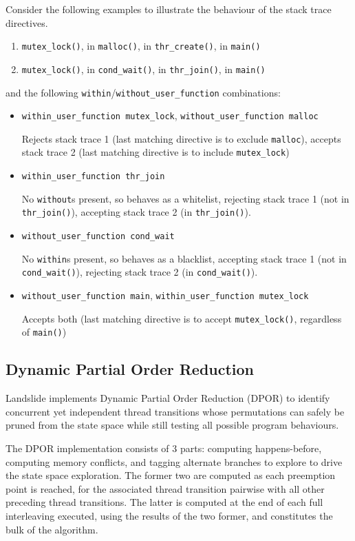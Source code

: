 Consider the following examples to illustrate the behaviour of the stack trace directives.
\begin{enumerate}
	\item
		{\tt mutex\_lock()}, in
		{\tt malloc()}, in
		{\tt thr\_create()}, in
		{\tt main()}
	\item
		{\tt mutex\_lock()}, in
		{\tt cond\_wait()}, in
		{\tt thr\_join()}, in
		{\tt main()}
\end{enumerate}
and the following {\tt within}/{\tt without\_user\_function} combinations:
\begin{itemize}
	\item
		{\tt within\_user\_function mutex\_lock},
		{\tt without\_user\_function malloc}

		Rejects stack trace 1 (last matching directive is to exclude {\tt malloc}),
		accepts stack trace 2 (last matching directive is to include {\tt mutex\_lock})
	\item
		{\tt within\_user\_function thr\_join}

		No {\tt without}s present, so behaves as a whitelist,
		rejecting stack trace 1 (not in {\tt thr\_join()}),
		accepting stack trace 2 (in {\tt thr\_join()}).
	\item
		{\tt without\_user\_function cond\_wait}

		No {\tt within}s present, so behaves as a blacklist,
		accepting stack trace 1 (not in {\tt cond\_\allowbreak{}wait()}),
		rejecting stack trace 2 (in {\tt cond\_wait()}).
	\item
		{\tt without\_user\_function main},
		{\tt within\_user\_function mutex\_lock}

		Accepts both (last matching directive is to accept {\tt mutex\_lock()},
		regardless of {\tt main()})
\end{itemize}


\subsection{Dynamic Partial Order Reduction}
\label{sec:landslide-dpor}

Landslide implements Dynamic Partial Order Reduction (DPOR) \cite{dpor}
to identify concurrent yet independent thread transitions
whose permutations can safely be pruned from the state space
while still testing all possible program behaviours.

The DPOR implementation consists of 3 parts:
computing happens-before,
computing memory conflicts,
and tagging alternate branches to explore to drive the state space exploration.
The former two are computed as each preemption point is reached,
for the associated thread transition pairwise with all other preceding thread transitions.
The latter is computed at the end of each full interleaving executed, using the results of the two former,
and constitutes the bulk of the algorithm.

